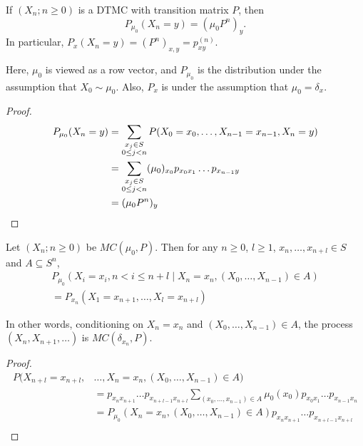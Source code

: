 \begin{theorem}
    If $(X_n; n \ge 0)$ is a DTMC with transition matrix $P$, then \[
        P_{\mu_0}(X_n = y) = (\mu_0 P^n)_y.
    \] In particular, $P_x(X_n = y) = (P^n)_{x,y} = p_{xy}^{(n)}$.
\end{theorem}
Here, $\mu_0$ is viewed as a row vector, and $P_{\mu_0}$ is the distribution
under the assumption that $X_0 \sim \mu_0$.
Also, $P_x$ is under the assumption that $\mu_0 = \delta_x$.
\begin{proof}
    \begin{align*}
        P_{\mu_0}(X_n = y)
            &= \sum_{\substack{x_j \in S \\ 0 \le j < n}}
                P(X_0 = x_0, \dots, X_{n-1} = x_{n-1}, X_n = y) \\
            &= \sum_{\substack{x_j \in S \\ 0 \le j < n}}
                (\mu_0)_{x_0} p_{x_0 x_1} \dots p_{x_{n-1} y} \\
            &= (\mu_0 P^n)_y \qedhere
    \end{align*}
\end{proof}

\begin{theorem}
    Let $(X_n; n \ge 0)$ be $MC(\mu_0, P)$.
    Then for any $n \ge 0$, $l \ge 1$, $x_n, \dots, x_{n+l} \in S$ and
    $A \subseteq S^n$, \begin{multline*}
        P_{\mu_0}(X_i = x_i, n < i \le n + l \mid X_n = x_n, (X_0, \dots, X_{n-1}) \in A) \\
        = P_{x_n}(X_1 = x_{n+1}, \dots, X_l = x_{n+l})
    \end{multline*}
\end{theorem}
In other words, conditioning on $X_n = x_n$ and $(X_0, \dots, X_{n-1}) \in A$,
the process $(X_n, X_{n+1}, \dots)$ is $MC(\delta_{x_n}, P)$.
\begin{proof}
    \begin{align*}
        P(X_{n+l} = x_{n+l}, &\dots, X_n = x_n, (X_0, \dots, X_{n-1}) \in A) \\
            &= p_{x_{n} x_{n+1}} \dots p_{x_{n+l-1} x_{n+l}}
            \sum_{(x_0, \dots, x_{n-1}) \in A} \mu_0(x_0) p_{x_0 x_1} \dots p_{x_{n-1} x_n} \\
            &= P_{\mu_0}(X_n = x_n, (X_0, \dots, X_{n-1}) \in A) p_{x_n x_{n+1}} \dots p_{x_{n+l-1} x_{n+l}} \\
    \end{align*}
\end{proof}
